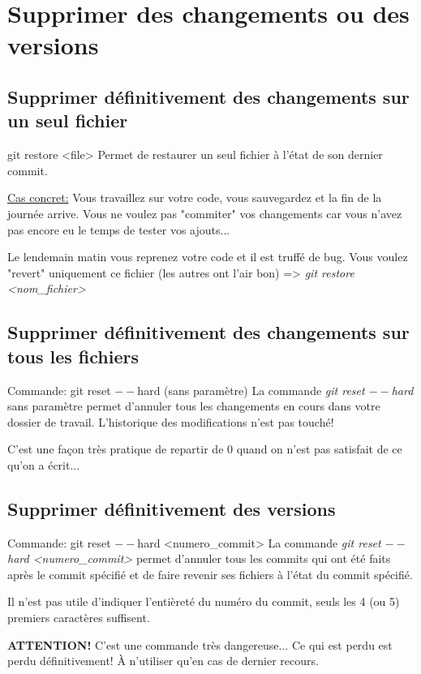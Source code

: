 \documentclass{beamer}
\begin{document}
\section{Supprimer des changements ou des versions}

\subsection{Supprimer définitivement des changements sur un seul fichier}
\begin{frame}{git restore <file>}
Permet de restaurer un seul fichier à l'état de son dernier commit.\\
\medskip

\underline{Cas concret:} Vous travaillez sur votre code, vous sauvegardez et la fin de la journée arrive. Vous ne voulez pas "commiter" vos changements car vous n'avez pas encore eu le temps de tester vos ajouts...\\
\medskip

Le lendemain matin vous reprenez votre code et il est truffé de bug. Vous voulez "revert" uniquement ce fichier (les autres ont l'air bon) => \textit{git restore <nom\_fichier>}
\end{frame}


\subsection{Supprimer définitivement des changements sur tous les fichiers}
\begin{frame}{Commande: git reset $--$hard (sans paramètre)}
La commande \textit{git reset $--$hard} sans paramètre permet d'annuler tous les changements en cours dans votre dossier de travail. L'historique des modifications n'est pas touché!\\
\medskip

C'est une façon très pratique de repartir de 0 quand on n'est pas satisfait de ce qu'on a écrit...
\end{frame}


\subsection{Supprimer définitivement des versions}
\begin{frame}{Commande: git reset $--$hard <numero\_commit>}
La commande \textit{git reset $--$hard <numero\_commit>} permet d'annuler tous les commits qui ont été faits après le commit spécifié et de faire revenir ses fichiers à l'état du commit spécifié.
\medskip

Il n'est pas utile d'indiquer l'entièreté du numéro du commit, seuls les 4 (ou 5) premiers caractères suffisent.
\medskip

\textbf{ATTENTION!} C'est une commande très dangereuse... Ce qui est perdu est perdu définitivement! À n'utiliser qu'en cas de dernier recours.
\end{frame}
\end{document}
